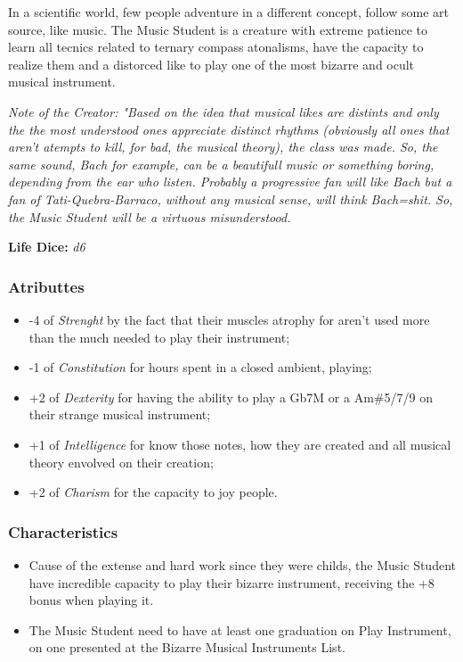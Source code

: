 \documentclass[ letterpaper,12pt]{article}
\begin{document}
In  a  scientific   world,   few   people adventure in a different  concept, follow some art source, like  music.  The  Music Student  is  a  creature   with   extreme patience to learn all tecnics related  to ternary  compass  atonalisms,  have   the capacity to realize them and  a distorced like to play one of the most bizarre  and ocult musical instrument. \\

{\it Note of the Creator: "Based  on  the idea that musical likes are distints  and only the the most understood  ones  appreciate distinct rhythms (obviously all ones that aren't  atempts  to   kill,  for bad, the musical theory), the class was made.  So, the same sound, Bach for example, can  be a beautifull music or  something  boring, depending  from  the  ear   who   listen. Probably a progressive fan will like Bach but a fan of Tati-Quebra-Barraco, without any musical sense, will think  Bach=shit. So, the Music Student will be a  virtuous misunderstood.

{\bf Life Dice: }{\it d6}\\ 

\subsubsection{Atributtes}
\begin{itemize}
\item{-4 of {\it Strenght} by  the fact  that their muscles atrophy for aren't used more than the much needed to play their instrument;}
\item{-1 of {\it Constitution} for hours  spent  in a closed ambient, playing;}
\item{+2 of {\it Dexterity} for having the ability to play  a  Gb7M  or  a  Am\#5/7/9  on  their strange musical instrument;}
\item{+1 of {\it Intelligence} for  know those notes, how  they  are  created  and  all musical theory envolved on their creation;}
\item{+2 of {\it Charism} for  the  capacity  to joy people.}
\end{itemize}

\subsubsection{Characteristics}
\begin{itemize}
\item{Cause of the extense and hard work  since they were childs, the Music Student  have incredible   capacity   to   play   their bizarre  instrument,  receiving  the   +8 bonus when playing it.}
\item{The Music Student need to have  at  least one graduation on Play Instrument, on one presented  at   the    Bizarre    Musical Instruments List.}
\end{itemize}

}
\end{document}

